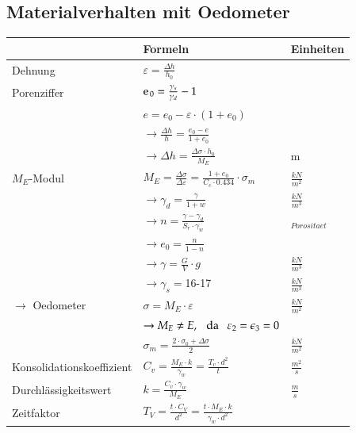 \begin{minipage}[t]{0.5\linewidth}
	\subsection{Materialverhalten mit Oedometer}

	\begin{tabular}{l|l|l}
				& Formeln 									& Einheiten \\ \hline \hline
	
		Dehnung &$\varepsilon = \frac{\Delta h}{h_0}$& \\ \hline
	
		Porenziffer&$\e_0=\frac{\gamma_s}{\gamma_d} -1$		& \\
				&$e=e_0-\varepsilon \cdot \left(1+ e_0\right)$	&\\
				&$\rightarrow\frac{\Delta h}{h}=\frac{e_0 - e}{1+e_0}$&\\	
				&$\rightarrow\Delta h=\frac{\Delta \sigma \cdot h_0}{M_E}$&m \\ \hline
	
		$M_E$-Modul&$M_E=\frac{\Delta \sigma}{\Delta \varepsilon}=\frac{1+e_0}{C_c \cdot 0.434}\cdot\sigma_m$&$\frac{kN}{m^2}$ \\	
				&$\rightarrow \gamma_d=\frac{\gamma}{1+w}$	&$\frac{kN}{m^3}$ \\
				&$\rightarrow n=\frac{\gamma-\gamma_d}{S_r\cdot\gamma_w}$&  $_{Porositaet}$ \\
				&$\rightarrow e_0=\frac{n}{1-n}$			& \\
				&$\rightarrow \gamma=\frac{G}{V}\cdot g$	& $\frac{kN}{m^3}$ \\
				&$\rightarrow \gamma_s=$16-17				& $\frac{kN}{m^3}$ \\ \hline

		$\rightarrow$ Oedometer&$\sigma=M_E \cdot \varepsilon$ &$\frac{kN}{m^2}$ \\
				&$\rightarrow M_E\neq E, \hspace{0.25cm}\text{da} \hspace{.25cm} \varepsilon_2=\epsilon_3=0$& \\
				&$\sigma_m=\frac{2\cdot\sigma_0+\Delta \sigma}{2}$&$\frac{kN}{m^2}$ \\ \hline

		Konsolidationskoeffizient&$C_v=\frac{M_E\cdot k}{\gamma_w}=\frac{T_v\cdot d^2}{t}$&$\frac{m^2}{s}$ \\ \hline

		Durchlässigkeitswert&$k=\frac{C_v\cdot\gamma_w}{M_E}$& $\frac{m}{s}$ \\ \hline
		Zeitfaktor&$T_V=\frac{t\cdot C_V}{d^2}=\frac{t\cdot M_E\cdot k}{\gamma_w\cdot d^2}$& \\ \hline
	

\end{tabular}
\end{minipage}

